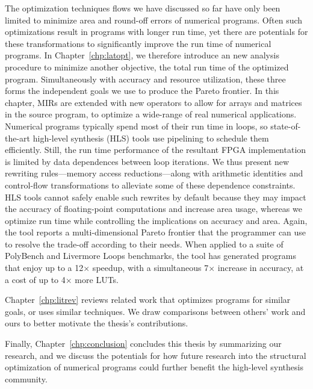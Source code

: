 The optimization techniques flows we have discussed so far have only been
limited to minimize area and round-off errors of numerical programs.  Often
such optimizations result in programs with longer run time, yet there are
potentials for these transformations to significantly improve the run time of
numerical programs.  In Chapter~\ref{chp:latopt}, we therefore introduce an
new analysis procedure to minimize another objective, the total run time of
the optimized program.  Simultaneously with accuracy and resource utilization,
these three forms the independent goals we use to produce the Pareto frontier.
In this chapter, MIRs are extended with new operators to allow for arrays and
matrices in the source program, to optimize a wide-range of real numerical
applications.  Numerical programs typically spend most of their run time in
loops, so state-of-the-art high-level synthesis (HLS) tools use pipelining to
schedule them efficiently.  Still, the run time performance of the resultant
FPGA implementation is limited by data dependences between loop iterations.
We thus present new rewriting rules---memory access reductions---along with
arithmetic identities and control-flow transformations to alleviate some of
these dependence constraints.  HLS tools cannot safely enable such rewrites by
default because they may impact the accuracy of floating-point computations
and increase area usage, whereas we optimize run time while controlling the
implications on accuracy and area.  Again, the tool reports a multi-dimensional
Pareto frontier that the programmer can use to resolve the trade-off according
to their needs.  When applied to a suite of PolyBench and Livermore Loops
benchmarks, the tool has generated programs that enjoy up to a 12$\times$
speedup, with a simultaneous 7$\times$ increase in accuracy, at a cost of up to
4$\times$ more LUTs.

Chapter~\ref{chp:litrev} reviews related work that optimizes programs for
similar goals, or uses similar techniques.  We draw comparisons between others'
work and ours to better motivate the thesis's contributions.

Finally, Chapter~\ref{chp:conclusion} concludes this thesis by summarizing
our research, and we discuss the potentials for how future research into
the structural optimization of numerical programs could further benefit the
high-level synthesis community.
